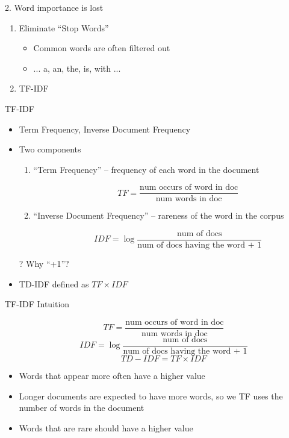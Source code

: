 \documentclass[aspectratio=169]{beamer}
\begin{document}
\begin{frame}{2. Word importance is lost}

\begin{enumerate}
\item Eliminate ``Stop Words''
\begin{itemize}
\item Common words are often filtered out
\item ... a, an, the, is, with ...
\end{itemize}

\item TF-IDF
\end{enumerate}
\end{frame}
\begin{frame}{TF-IDF}

\begin{itemize}
\item Term Frequency, Inverse Document Frequency
\item Two components
\begin{enumerate}

\item ``Term Frequency''  --  frequency of each word in the document
	\begin{itemize}
	\item[]
	$$TF = \frac{\textrm{num occurs of word in doc}}{\textrm{num words in doc}}$$
	\end{itemize}
\item ``Inverse Document Frequency'' -- rareness of the word in the corpus
	\begin{itemize}
	\item[] 
	$$IDF = \log \frac{\textrm{num of docs}}{\textrm{num of docs having the word + 1}}$$
	\end{itemize}
\end{enumerate}
\item[?] Why ``+1''? %
\item TD-IDF defined as $TF \times IDF$
\end{itemize}
\end{frame}
\begin{frame}{TF-IDF Intuition}

\begin{itemize}
\item[]
	$$TF = \frac{\textrm{num occurs of word in doc}}{\textrm{num words in doc}}$$
	$$IDF = \log \frac{\textrm{num of docs}}{\textrm{num of docs having the word + 1}}$$
$$TD-IDF = TF \times IDF$$

\item Words that appear more often have a higher value
\item Longer documents are expected to have more words, so we TF uses the number of words in the document
\item Words that are rare should have a higher value
\end{itemize}
\end{frame}
\end{document}
